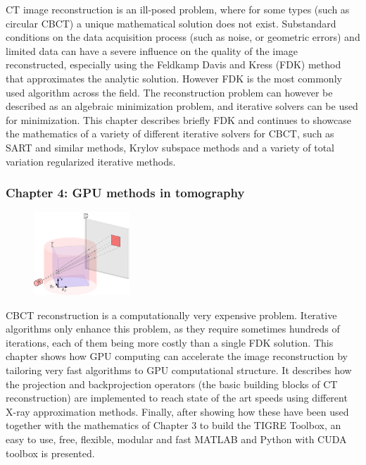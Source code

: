 CT image reconstruction is an ill-posed problem, where for some types (such as circular CBCT) a unique mathematical solution does not exist. Substandard conditions on the data acquisition process (such as noise, or geometric errors) and limited data can have a severe influence on the quality of the image reconstructed, especially using the Feldkamp Davis and Kress (FDK) method that approximates the analytic solution. However FDK is the most commonly used algorithm across the field. The reconstruction problem can however be described as an algebraic minimization problem, and iterative solvers can be used for minimization. This chapter describes briefly FDK and continues to showcase the mathematics of a variety of different iterative solvers for CBCT, such as SART and similar methods, Krylov subspace methods and a variety of total variation regularized iterative methods.
\FloatBarrier
\subsubsection{Chapter 4: GPU methods in tomography}



\begin{figure}
\centering
\includegraphics[width=0.32\textwidth]{GPUmethods/projcoord-figure0.pdf}
\end{figure}

CBCT reconstruction is a computationally very expensive problem. Iterative algorithms only enhance this problem, as they require sometimes hundreds of iterations, each of them being more costly than a single FDK solution. This chapter shows how GPU computing can accelerate the image reconstruction by tailoring very fast algorithms to GPU computational structure. It describes how the projection and backprojection operators (the basic building blocks of CT reconstruction) are implemented to reach state of the art speeds using different X-ray approximation methods. Finally, after showing how these have been used together with the mathematics of Chapter 3 to build the TIGRE Toolbox, an easy to use, free, flexible, modular and fast MATLAB and Python with CUDA toolbox is presented. 
\FloatBarrier


